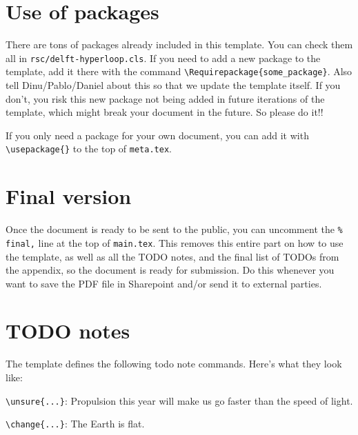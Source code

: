 \section*{Use of packages}

There are tons of packages already included in this template. You can check them all in \verb|rsc/delft-hyperloop.cls|. If you need to add a new package to the template, add it there with the command \verb|\Requirepackage{some_package}|. Also tell Dinu/Pablo/Daniel about this so that we update the template itself. If you don't, you risk this new package not being added in future iterations of the template, which might break your document in the future. So please do it!!

If you only need a package for your own document, you can add it with \verb|\usepackage{}| to the top of \verb|meta.tex|.

\section*{Final version}

Once the document is ready to be sent to the public, you can uncomment the \verb|% final,| line at the top of \verb|main.tex|. This removes this entire part on how to use the template, as well as all the TODO notes, and the final list of TODOs from the appendix, so the document is ready for submission. Do this whenever you want to save the PDF file in Sharepoint and/or send it to external parties.


\section*{TODO notes}

The template defines the following todo note commands. Here's what they look like:

\vspace{5em}



\verb|\unsure{...}|: Propulsion this year will make us go faster than the speed of light. 

\vspace{5em}

\verb|\change{...}|: The Earth is flat. 

